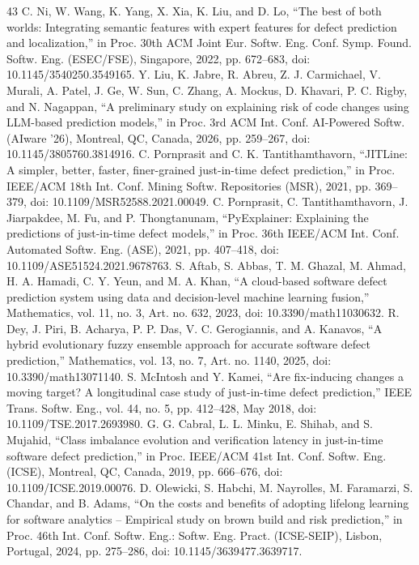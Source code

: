\begin{thebibliography}{43}
 C. Ni, W. Wang, K. Yang, X. Xia, K. Liu, and D. Lo, ``The best of both worlds: Integrating semantic features with expert features for defect prediction and localization,'' in Proc. 30th ACM Joint Eur. Softw. Eng. Conf. Symp. Found. Softw. Eng. (ESEC/FSE), Singapore, 2022, pp. 672--683, doi: \mbox{10.1145/3540250.3549165}.
 Y. Liu, K. Jabre, R. Abreu, Z. J. Carmichael, V. Murali, A. Patel, J. Ge, W. Sun, C. Zhang, A. Mockus, D. Khavari, P. C. Rigby, and N. Nagappan, ``A preliminary study on explaining risk of code changes using LLM-based prediction models,'' in Proc. 3rd ACM Int. Conf. AI-Powered Softw. (AIware '26), Montreal, QC, Canada, 2026, pp. 259--267, doi: \mbox{10.1145/3805760.3814916}.
 C. Pornprasit and C. K. Tantithamthavorn, ``JITLine: A simpler, better, faster, finer-grained just-in-time defect prediction,'' in Proc. IEEE/ACM 18th Int. Conf. Mining Softw. Repositories (MSR), 2021, pp. 369--379, doi: \mbox{10.1109/MSR52588.2021.00049}.
 C. Pornprasit, C. Tantithamthavorn, J. Jiarpakdee, M. Fu, and P. Thongtanunam, ``PyExplainer: Explaining the predictions of just-in-time defect models,'' in Proc. 36th IEEE/ACM Int. Conf. Automated Softw. Eng. (ASE), 2021, pp. 407--418, doi: \mbox{10.1109/ASE51524.2021.9678763}.
 S. Aftab, S. Abbas, T. M. Ghazal, M. Ahmad, H. A. Hamadi, C. Y. Yeun, and M. A. Khan, ``A cloud-based software defect prediction system using data and decision-level machine learning fusion,'' Mathematics, vol. 11, no. 3, Art. no. 632, 2023, doi: \mbox{10.3390/math11030632}.
 R. Dey, J. Piri, B. Acharya, P. P. Das, V. C. Gerogiannis, and A. Kanavos, ``A hybrid evolutionary fuzzy ensemble approach for accurate software defect prediction,'' Mathematics, vol. 13, no. 7, Art. no. 1140, 2025, doi: \mbox{10.3390/math13071140}.
 S. McIntosh and Y. Kamei, ``Are fix-inducing changes a moving target? A longitudinal case study of just-in-time defect prediction,'' IEEE Trans. Softw. Eng., vol. 44, no. 5, pp. 412--428, May 2018, doi: \mbox{10.1109/TSE.2017.2693980}.
 G. G. Cabral, L. L. Minku, E. Shihab, and S. Mujahid, ``Class imbalance evolution and verification latency in just-in-time software defect prediction,'' in Proc. IEEE/ACM 41st Int. Conf. Softw. Eng. (ICSE), Montreal, QC, Canada, 2019, pp. 666--676, doi: \mbox{10.1109/ICSE.2019.00076}.
 D. Olewicki, S. Habchi, M. Nayrolles, M. Faramarzi, S. Chandar, and B. Adams, ``On the costs and benefits of adopting lifelong learning for software analytics -- Empirical study on brown build and risk prediction,'' in Proc. 46th Int. Conf. Softw. Eng.: Softw. Eng. Pract. (ICSE-SEIP), Lisbon, Portugal, 2024, pp. 275--286, doi: \mbox{10.1145/3639477.3639717}.

\end{thebibliography}
